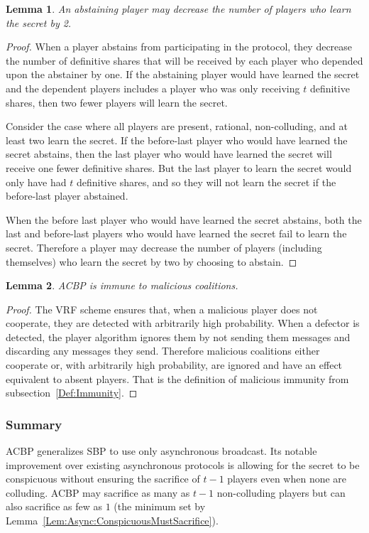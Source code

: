 \documentclass[12pt]{article}
\newtheorem{lemma}{Lemma}
\begin{document}
\begin{lemma}\label{Lem:ACBP:AbstainBad}An abstaining player may decrease the number of players who learn the secret by 2.\end{lemma}
\begin{proof}
When a player abstains from participating in the protocol, they decrease the number of definitive shares that will be received by each player who depended upon the abstainer by one. If the abstaining player would have learned the secret and the dependent players includes a player who was only receiving $t$ definitive shares, then two fewer players will learn the secret.

Consider the case where all players are present, rational, non-colluding, and at least two learn the secret. If the before-last player who would have learned the secret abstains, then the last player who would have learned the secret will receive one fewer definitive shares. But the last player to learn the secret would only have had $t$ definitive shares, and so they will not learn the secret if the before-last player abstained.

When the before last player who would have learned the secret abstains, both the last and before-last players who would have learned the secret fail to learn the secret. Therefore a player may decrease the number of players (including themselves) who learn the secret by two by choosing to abstain.
\end{proof}

\begin{lemma}\label{Lem:ACBP:MalImmune}ACBP is immune to malicious coalitions.\end{lemma}
\begin{proof}
The VRF scheme ensures that, when a malicious player does not cooperate, they are detected with arbitrarily high probability. When a defector is detected, the player algorithm ignores them by not sending them messages and discarding any messages they send. Therefore malicious coalitions either cooperate or, with arbitrarily high probability, are ignored and have an effect equivalent to absent players. That is the definition of malicious immunity from subsection~\ref{Def:Immunity}.
\end{proof}

\subsubsection{Summary}

ACBP generalizes SBP to use only asynchronous broadcast. Its notable improvement over existing asynchronous protocols is allowing for the secret to be conspicuous without ensuring the sacrifice of $t-1$ players even when none are colluding. ACBP may sacrifice as many as $t-1$ non-colluding players but can also sacrifice as few as $1$ (the minimum set by Lemma~\ref{Lem:Async:ConspicuousMustSacrifice}).
\end{document}
